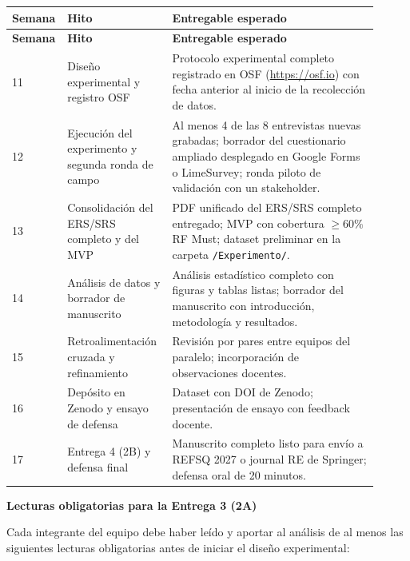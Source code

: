 \documentclass[11pt,a4paper]{article}
\newcounter{secc}
\newcommand{\secband}[1]{%
    \stepcounter{secc}\par\vspace{9pt}\noindent
    {\setlength{\fboxsep}{0pt}%
        \colorbox{uteqgold}{\parbox[c][20pt][c]{0.05\textwidth}{\centering\textbf{\color{white}\small \arabic{secc}}}}%
        \colorbox{uteqgreen}{\parbox[c][20pt][c]{0.95\textwidth}{\hspace{8pt}\textbf{\color{white}\small #1}}}%
    }\par\vspace{5pt}}
\newcommand{\hh}[1]{\cellcolor{uteqgreen}\textbf{\color{white}\small #1}}
\begin{document}
\begin{longtable}{@{}p{0.08\linewidth} p{0.28\linewidth} p{0.55\linewidth}@{}}
    \hh{Semana} & \hh{Hito} & \hh{Entregable esperado}\\
    \endfirsthead
    \hh{Semana} & \hh{Hito} & \hh{Entregable esperado}\\
    \endhead
    11 & Diseño experimental y registro OSF & Protocolo experimental completo registrado en OSF (\url{https://osf.io}) con fecha anterior al inicio de la recolección de datos.\\
    12 & Ejecución del experimento y segunda ronda de campo & Al menos 4 de las 8 entrevistas nuevas grabadas; borrador del cuestionario ampliado desplegado en Google Forms o LimeSurvey; ronda piloto de validación con un stakeholder.\\
    13 & Consolidación del ERS/SRS completo y del MVP & PDF unificado del ERS/SRS completo entregado; MVP con cobertura $\geq 60\%$ RF Must; dataset preliminar en la carpeta \texttt{/Experimento/}.\\
    14 & Análisis de datos y borrador de manuscrito & Análisis estadístico completo con figuras y tablas listas; borrador del manuscrito con introducción, metodología y resultados.\\
    15 & Retroalimentación cruzada y refinamiento & Revisión por pares entre equipos del paralelo; incorporación de observaciones docentes.\\
    16 & Depósito en Zenodo y ensayo de defensa & Dataset con DOI de Zenodo; presentación de ensayo con feedback docente.\\
    17 & Entrega 4 (2B) y defensa final & Manuscrito completo listo para envío a REFSQ 2027 o journal RE de Springer; defensa oral de 20 minutos.\\
\end{longtable}

\secband{Lecturas obligatorias para la Entrega 3 (2A)}

Cada integrante del equipo debe haber leído y aportar al análisis de al menos las siguientes lecturas obligatorias antes de iniciar el diseño experimental:
\end{document}
